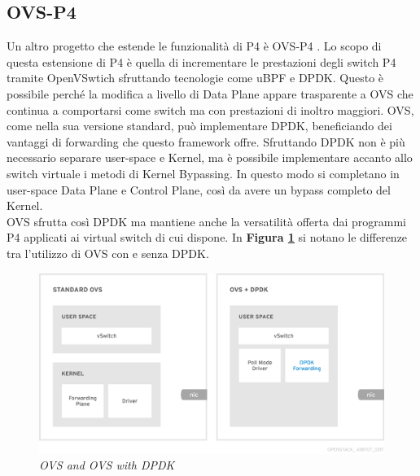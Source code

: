 \subsection*{OVS-P4}
Un altro progetto che estende le funzionalità di P4 è OVS-P4 \cite{osinski_p4-ovs_2022}. Lo scopo di questa estensione di P4 è quella di incrementare le prestazioni degli switch P4 tramite OpenVSwtich sfruttando tecnologie come uBPF \cite{noauthor_ubpf} e DPDK.
Questo è possibile perché la modifica a livello di Data Plane appare trasparente a OVS che continua a comportarsi come switch ma con prestazioni di inoltro maggiori.
OVS, come nella sua versione standard, può implementare DPDK, beneficiando dei vantaggi di forwarding che questo framework offre. Sfruttando DPDK non è più necessario separare user-space e Kernel, ma è possibile implementare accanto allo switch virtuale i metodi di Kernel Bypassing. In questo modo si completano in user-space Data Plane e Control Plane, così da avere un bypass completo del Kernel. \\
OVS sfrutta così DPDK ma mantiene anche la versatilità offerta dai programmi P4 applicati ai virtual switch di cui dispone.
In \textbf{{Figura \ref{fig:ovs_dpdk}}}
 si notano le differenze tra l'utilizzo di OVS con e senza DPDK.
\vspace{2cm}
\FloatBarrier
\begin{figure}[h]
\includegraphics[scale=0.27]{images/ovs_dpdk.png}
\centering
\caption{\textit{OVS and OVS with DPDK}}
\label{fig:ovs_dpdk}
\end{figure}
\FloatBarrier

